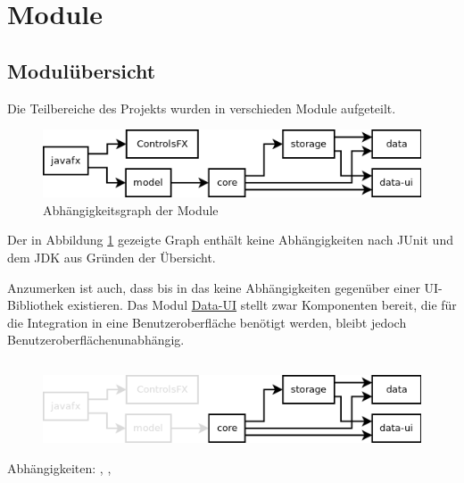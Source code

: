 
\newcommand{\depBox}[1]{
	\begin{adjustbox}{minipage=0.90\textwidth,margin=0 \smallskipamount,center}
		Abhängigkeiten:	 #1
	\end{adjustbox} ~\\
}

\section{Module}
\subsection{Modulübersicht}
Die Teilbereiche des Projekts wurden in verschieden Module aufgeteilt.

\begin{figure}[h!]
	\centering
	\includegraphics[width=.8\textwidth]{module_dependencies.png}
	\caption{Abhängigkeitsgraph der Module}
	\label{mod_dep_view}
\end{figure}

Der in Abbildung \ref{mod_dep_view} gezeigte Graph enthält keine Abhängigkeiten nach JUnit und
dem JDK aus Gründen der Übersicht.

Anzumerken ist auch, dass bis in das  keine Abhängigkeiten
gegenüber einer UI-Bibliothek existieren. Das Modul \hyperref[mod_data-ui]{Data-UI} stellt
zwar Komponenten bereit, die für die Integration in eine Benutzeroberfläche benötigt werden,
bleibt jedoch Benutzeroberflächenunabhängig.


\subsection{\textModCore}
\label{\textModCore}
\begin{figure}[h!]
	\centering
	\includegraphics[width=.8\textwidth]{module_dependencies_core.png}
\end{figure}
\depBox{, , \refLongP{\textModStorage}}

